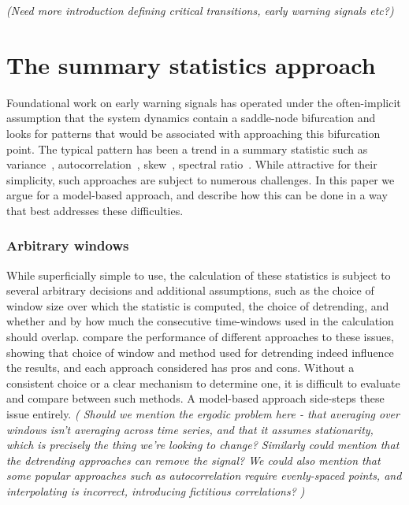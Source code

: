 \documentclass[authoryear,preprint,11pt]{elsarticle}
\newcommand{\cb}[1]{{\it \color{darkgreen} (#1)}}
\begin{document}
\cb{Need more introduction defining critical transitions, early warning signals etc?}


\section{The summary statistics approach}
Foundational work on early warning signals has operated under the often-implicit assumption %
that the system dynamics contain a saddle-node bifurcation and
looks for patterns that would be associated with approaching this bifurcation point.
The typical pattern has been a trend in a summary statistic such as
variance~\citep{Carpenter2006}, autocorrelation~\citep{Held2004, Dakos2008},
skew~\citep{Guttal2008}, spectral ratio~\citep{Biggs2009}.
While attractive for their simplicity, such approaches are subject to numerous challenges.
In this paper we argue for a model-based approach, 
and describe how this can be done in a way that best addresses these difficulties.

\subsubsection*{Arbitrary windows}
While superficially simple to use, the calculation of these statistics is subject to 
several arbitrary decisions and additional assumptions,
such as the choice of window size over which the statistic is computed,
the choice of detrending,
and whether and by how much the consecutive time-windows used in the calculation should overlap.  
\citet{Lenton2012} compare the performance of different approaches to these issues,
showing that choice of window and method used for detrending indeed influence the results,
and each approach considered has pros and cons.  
Without a consistent choice or a clear mechanism to determine one, %
it is difficult to evaluate and compare between such methods.  
A model-based approach side-steps these issue entirely.  
\cb{
 Should we mention the ergodic problem here - that averaging over windows isn't averaging across time series, 
 and that it assumes stationarity, which is precisely the thing we're looking to change?  
 Similarly could mention that the detrending approaches can remove the signal?
 We could also mention that some popular approaches such as autocorrelation require evenly-spaced points,
 and interpolating is incorrect, introducing fictitious correlations?
}
\end{document}
